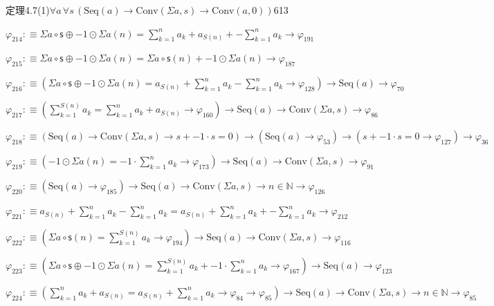 \begin{fullproof}{定理4.7(1)}{$\forall a\,\forall s\,(\mathrm{Seq}(a) \to \mathrm{Conv}(\Sigma a,s) \to \mathrm{Conv}(a,0))$}{613}
\begin{abbrevlist}
\item $\varphi_{214} :\equiv \Sigma a \circ \mathsf{s} \oplus -1 \odot \Sigma a(n) = {\textstyle\sum_{k=1}^{n} a_{k}} + a_{S(n)} + -{\textstyle\sum_{k=1}^{n} a_{k}} \to \varphi_{191}$
\item $\varphi_{215} :\equiv \Sigma a \circ \mathsf{s} \oplus -1 \odot \Sigma a(n) = \Sigma a \circ \mathsf{s}(n) + -1 \odot \Sigma a(n) \to \varphi_{187}$
\item $\varphi_{216} :\equiv (\Sigma a \circ \mathsf{s} \oplus -1 \odot \Sigma a(n) = a_{S(n)} + {\textstyle\sum_{k=1}^{n} a_{k}} - {\textstyle\sum_{k=1}^{n} a_{k}} \to \varphi_{128}) \to \mathrm{Seq}(a) \to \varphi_{70}$
\item $\varphi_{217} :\equiv ({\textstyle\sum_{k=1}^{S(n)} a_{k}} = {\textstyle\sum_{k=1}^{n} a_{k}} + a_{S(n)} \to \varphi_{160}) \to \mathrm{Seq}(a) \to \mathrm{Conv}(\Sigma a,s) \to \varphi_{86}$
\item $\varphi_{218} :\equiv (\mathrm{Seq}(a) \to \mathrm{Conv}(\Sigma a,s) \to s + -1 \cdot s = 0) \to (\mathrm{Seq}(a) \to \varphi_{53}) \to (s + -1 \cdot s = 0 \to \varphi_{127}) \to \varphi_{36}$
\item $\varphi_{219} :\equiv (-1 \odot \Sigma a(n) = -1 \cdot {\textstyle\sum_{k=1}^{n} a_{k}} \to \varphi_{173}) \to \mathrm{Seq}(a) \to \mathrm{Conv}(\Sigma a,s) \to \varphi_{91}$
\item $\varphi_{220} :\equiv (\mathrm{Seq}(a) \to \varphi_{185}) \to \mathrm{Seq}(a) \to \mathrm{Conv}(\Sigma a,s) \to n \in \mathbb{N} \to \varphi_{126}$
\item $\varphi_{221} :\equiv a_{S(n)} + {\textstyle\sum_{k=1}^{n} a_{k}} - {\textstyle\sum_{k=1}^{n} a_{k}} = a_{S(n)} + {\textstyle\sum_{k=1}^{n} a_{k}} + -{\textstyle\sum_{k=1}^{n} a_{k}} \to \varphi_{212}$
\item $\varphi_{222} :\equiv (\Sigma a \circ \mathsf{s}(n) = {\textstyle\sum_{k=1}^{S(n)} a_{k}} \to \varphi_{194}) \to \mathrm{Seq}(a) \to \mathrm{Conv}(\Sigma a,s) \to \varphi_{116}$
\item $\varphi_{223} :\equiv (\Sigma a \circ \mathsf{s} \oplus -1 \odot \Sigma a(n) = {\textstyle\sum_{k=1}^{S(n)} a_{k}} + -1 \cdot {\textstyle\sum_{k=1}^{n} a_{k}} \to \varphi_{167}) \to \mathrm{Seq}(a) \to \varphi_{123}$
\item $\varphi_{224} :\equiv ({\textstyle\sum_{k=1}^{n} a_{k}} + a_{S(n)} = a_{S(n)} + {\textstyle\sum_{k=1}^{n} a_{k}} \to \varphi_{84} \to \varphi_{85}) \to \mathrm{Seq}(a) \to \mathrm{Conv}(\Sigma a,s) \to n \in \mathbb{N} \to \varphi_{85}$

\end{abbrevlist}
\end{fullproof}
